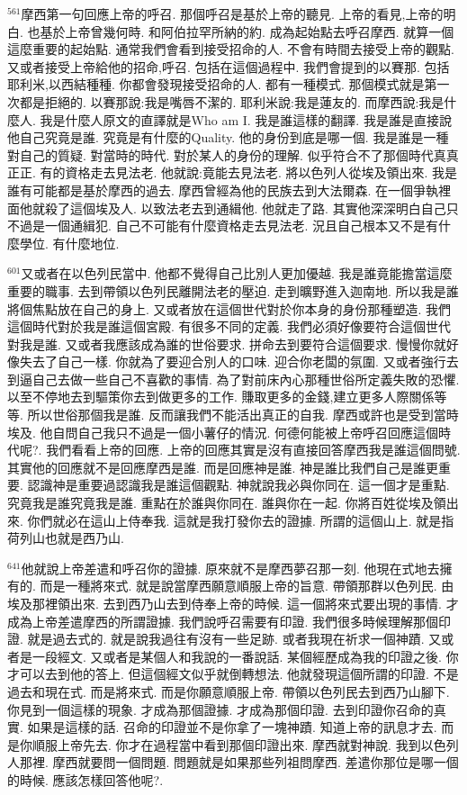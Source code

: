 \documentclass{book}
\begin{document}
$^{561}$摩西第一句回應上帝的呼召.
那個呼召是基於上帝的聽見.
上帝的看見,上帝的明白.
也基於上帝曾幾何時.
和阿伯拉罕所納的約.
成為起始點去呼召摩西.
就算一個這麼重要的起始點.
通常我們會看到接受招命的人.
不會有時間去接受上帝的觀點.
又或者接受上帝給他的招命,呼召.
包括在這個過程中.
我們會提到的以賽那.
包括耶利米,以西結種種.
你都會發現接受招命的人.
都有一種模式.
那個模式就是第一次都是拒絕的.
以賽那說:我是嘴唇不潔的.
耶利米說:我是蓮友的.
而摩西說:我是什麼人.
我是什麼人原文的直譯就是Who am I.
我是誰這樣的翻譯.
我是誰是直接說他自己究竟是誰.
究竟是有什麼的Quality.
他的身份到底是哪一個.
我是誰是一種對自己的質疑.
對當時的時代.
對於某人的身份的理解.
似乎符合不了那個時代真真正正.
有的資格走去見法老.
他就說:竟能去見法老.
將以色列人從埃及領出來.
我是誰有可能都是基於摩西的過去.
摩西曾經為他的民族去到大法爾森.
在一個爭執裡面他就殺了這個埃及人.
以致法老去到通緝他.
他就走了路.
其實他深深明白自己只不過是一個通緝犯.
自己不可能有什麼資格走去見法老.
況且自己根本又不是有什麼學位.
有什麼地位.

$^{601}$又或者在以色列民當中.
他都不覺得自己比別人更加優越.
我是誰竟能擔當這麼重要的職事.
去到帶領以色列民離開法老的壓迫.
走到曠野進入迦南地.
所以我是誰將個焦點放在自己的身上.
又或者放在這個世代對於你本身的身份那種塑造.
我們這個時代對於我是誰這個宮殿.
有很多不同的定義.
我們必須好像要符合這個世代對我是誰.
又或者我應該成為誰的世俗要求.
拼命去到要符合這個要求.
慢慢你就好像失去了自己一樣.
你就為了要迎合別人的口味.
迎合你老闆的氛圍.
又或者強行去到逼自己去做一些自己不喜歡的事情.
為了對前床內心那種世俗所定義失敗的恐懼.
以至不停地去到驅策你去到做更多的工作.
賺取更多的金錢,建立更多人際關係等等.
所以世俗那個我是誰.
反而讓我們不能活出真正的自我.
摩西或許也是受到當時埃及.
他自問自己我只不過是一個小薯仔的情況.
何德何能被上帝呼召回應這個時代呢?.
我們看看上帝的回應.
上帝的回應其實是沒有直接回答摩西我是誰這個問號.
其實他的回應就不是回應摩西是誰.
而是回應神是誰.
神是誰比我們自己是誰更重要.
認識神是重要過認識我是誰這個觀點.
神就說我必與你同在.
這一個才是重點.
究竟我是誰究竟我是誰.
重點在於誰與你同在.
誰與你在一起.
你將百姓從埃及領出來.
你們就必在這山上侍奉我.
這就是我打發你去的證據.
所謂的這個山上.
就是指荷列山也就是西乃山.

$^{641}$他就說上帝差遣和呼召你的證據.
原來就不是摩西夢召那一刻.
他現在式地去擁有的.
而是一種將來式.
就是說當摩西願意順服上帝的旨意.
帶領那群以色列民.
由埃及那裡領出來.
去到西乃山去到侍奉上帝的時候.
這一個將來式要出現的事情.
才成為上帝差遣摩西的所謂證據.
我們說呼召需要有印證.
我們很多時候理解那個印證.
就是過去式的.
就是說我過往有沒有一些足跡.
或者我現在祈求一個神蹟.
又或者是一段經文.
又或者是某個人和我說的一番說話.
某個經歷成為我的印證之後.
你才可以去到他的答上.
但這個經文似乎就倒轉想法.
他就發現這個所謂的印證.
不是過去和現在式.
而是將來式.
而是你願意順服上帝.
帶領以色列民去到西乃山腳下.
你見到一個這樣的現象.
才成為那個證據.
才成為那個印證.
去到印證你召命的真實.
如果是這樣的話.
召命的印證並不是你拿了一塊神蹟.
知道上帝的訊息才去.
而是你順服上帝先去.
你才在過程當中看到那個印證出來.
摩西就對神說.
我到以色列人那裡.
摩西就要問一個問題.
問題就是如果那些列祖問摩西.
差遣你那位是哪一個的時候.
應該怎樣回答他呢?.
\end{document}
